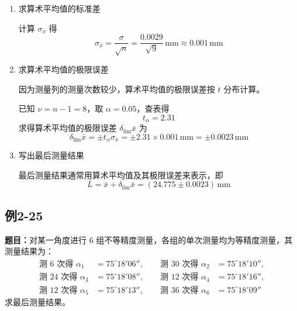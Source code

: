 \documentclass[UTF8,zihao=-4]{ctexart}
\newcommand{\problem}[1]{\subsection*{#1}}
\newcommand{\timu}{\noindent\textbf{题目：}}
\begin{document}
\begin{enumerate}[label=\arabic*.]
    若发现测量列存在粗大误差，应将含有粗大误差的测得值剔除，然后再按上述步骤重新计算，直至所有测得值皆不包含粗大误差时为止。

    \item 求算术平均值的标准差

    计算 $\sigma_{\bar{x}}$ 得
    \begin{equation*}
        \sigma_{\bar{x}}
        =
        \frac{\sigma}{\sqrt{n}}
        =
        \frac{0.0029}{\sqrt{9}}\,\mathrm{mm}
        \approx0.001\,\mathrm{mm}
    \end{equation*}

    \item 求算术平均值的极限误差

    因为测量列的测量次数较少，算术平均值的极限误差按 $t$ 分布计算。

    已知 $\nu=n-1=8$，取 $\alpha=0.05$，查表得
    \begin{equation*}
        t_{\alpha}=2.31
    \end{equation*}
    求得算术平均值的极限误差 $\delta_{\lim}\bar{x}$ 为
    \begin{equation*}
        \delta_{\lim}\bar{x}
        =
        \pm t_{\alpha}\sigma_{\bar{x}}
        =
        \pm2.31\times0.001\,\mathrm{mm}
        =
        \pm0.0023\,\mathrm{mm}
    \end{equation*}

    \item 写出最后测量结果

    最后测量结果通常用算术平均值及其极限误差来表示，即
    \begin{equation*}
        L
        =
        \bar{x}+\delta_{\lim}\bar{x}
        =
        (24.775\pm0.0023)\,\mathrm{mm}
    \end{equation*}
\end{enumerate}

\newpage

\problem{例2-25}
\timu 对某一角度进行 $6$ 组不等精度测量，各组的单次测量均为等精度测量，其测量结果为：
\begin{equation*}
\begin{aligned}
    \text{测 }6\text{ 次得 }\alpha_1
    &=75^\circ18'06'',\qquad
    \text{测 }30\text{ 次得 }\alpha_2
    &=75^\circ18'10'',\\
    \text{测 }24\text{ 次得 }\alpha_3
    &=75^\circ18'08'',\qquad
    \text{测 }12\text{ 次得 }\alpha_4
    &=75^\circ18'16'',\\
    \text{测 }12\text{ 次得 }\alpha_5
    &=75^\circ18'13'',\qquad
    \text{测 }36\text{ 次得 }\alpha_6
    &=75^\circ18'09''
\end{aligned}
\end{equation*}
求最后测量结果。
\end{document}
